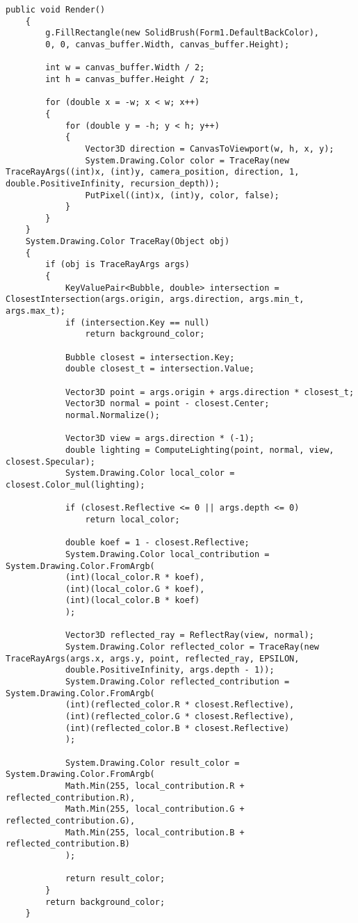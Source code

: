 \begin{lstlisting}[label=lst:trace_ray, caption=Реализация алгоритма обратной трассировки лучей]
	public void Render()
	{
		g.FillRectangle(new SolidBrush(Form1.DefaultBackColor),
		0, 0, canvas_buffer.Width, canvas_buffer.Height);
		
		int w = canvas_buffer.Width / 2;
		int h = canvas_buffer.Height / 2;
		
		for (double x = -w; x < w; x++)
		{
			for (double y = -h; y < h; y++)
			{
				Vector3D direction = CanvasToViewport(w, h, x, y);
				System.Drawing.Color color = TraceRay(new TraceRayArgs((int)x, (int)y, camera_position, direction, 1, double.PositiveInfinity, recursion_depth));
				PutPixel((int)x, (int)y, color, false);
			}
		}
	}
	System.Drawing.Color TraceRay(Object obj)
	{
		if (obj is TraceRayArgs args)
		{
			KeyValuePair<Bubble, double> intersection = ClosestIntersection(args.origin, args.direction, args.min_t, args.max_t);
			if (intersection.Key == null)
				return background_color;
			
			Bubble closest = intersection.Key;
			double closest_t = intersection.Value;
			
			Vector3D point = args.origin + args.direction * closest_t;
			Vector3D normal = point - closest.Center;
			normal.Normalize();
			
			Vector3D view = args.direction * (-1);
			double lighting = ComputeLighting(point, normal, view, closest.Specular);
			System.Drawing.Color local_color = closest.Color_mul(lighting);
			
			if (closest.Reflective <= 0 || args.depth <= 0)
				return local_color;
			
			double koef = 1 - closest.Reflective;
			System.Drawing.Color local_contribution = System.Drawing.Color.FromArgb(
			(int)(local_color.R * koef),
			(int)(local_color.G * koef),
			(int)(local_color.B * koef)
			);
			
			Vector3D reflected_ray = ReflectRay(view, normal);
			System.Drawing.Color reflected_color = TraceRay(new TraceRayArgs(args.x, args.y, point, reflected_ray, EPSILON,
			double.PositiveInfinity, args.depth - 1));
			System.Drawing.Color reflected_contribution = System.Drawing.Color.FromArgb(
			(int)(reflected_color.R * closest.Reflective),
			(int)(reflected_color.G * closest.Reflective),
			(int)(reflected_color.B * closest.Reflective)
			);
			
			System.Drawing.Color result_color = System.Drawing.Color.FromArgb(
			Math.Min(255, local_contribution.R + reflected_contribution.R),
			Math.Min(255, local_contribution.G + reflected_contribution.G),
			Math.Min(255, local_contribution.B + reflected_contribution.B)
			);

			return result_color;
		}
		return background_color;
	}
\end{lstlisting}
